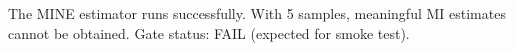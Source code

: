 
\begin{table}[htbp]
\centering
{}
\end{table}

The MINE estimator runs successfully. With 5 samples, meaningful MI estimates cannot be obtained. Gate status: FAIL (expected for smoke test).
